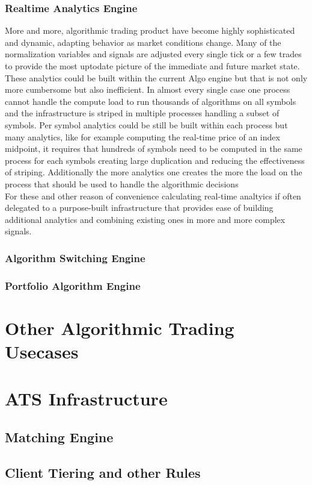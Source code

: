 \subsubsection{Realtime Analytics Engine}
More and more, algorithmic trading product have become highly sophisticated and dynamic, adapting behavior as market conditions change. Many of the normalization variables and signals are adjusted every single tick or a few trades to provide the most uptodate picture of the immediate and future market state. These analytics could be built within the current Algo engine but that is not only more cumbersome but also inefficient. In almost every single case one process cannot handle the compute load to run thousands of algorithms on all symbols and the infrastructure is striped in multiple processes handling a subset of symbols. Per symbol analytics could be still be built within each process but many analytics, like for example computing the real-time price of an index midpoint, it requires that hundreds of symbols need to be computed in the same process for each symbols creating large duplication and reducing the effectiveness of striping. Additionally the more analytics one creates the more the load on the process that should be used to handle the algorithmic decisions\\

For these and other reason of convenience calculating real-time analtyics if often delegated to a purpose-built infrastructure that provides ease of building additional analytics and combining existing ones in more and more complex signals. 
\subsubsection{Algorithm Switching Engine}
\subsubsection{Portfolio Algorithm Engine}

\section{Other Algorithmic Trading Usecases}


\section{ATS Infrastructure}
\subsection{Matching Engine}
\subsection{Client Tiering and other Rules}

